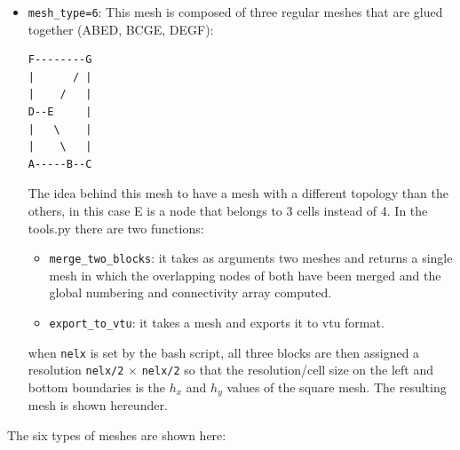 \begin{itemize}
\item \lstinline{mesh_type=6}: This mesh is composed of three
regular meshes that are glued together (ABED, BCGE, DEGF):
\begin{verbatim}
F--------G
|      / |
|    /   |
D--E     |
|   \    |
|    \   |
A-----B--C
\end{verbatim}
The idea behind this mesh to have a mesh with a different topology than the others, 
in this case E is a node that belongs to 3 cells instead of 4.
In the {\pythonfile tools.py} there are two functions:
\begin{itemize}
\item \verb'merge_two_blocks': it takes as arguments two meshes and returns a single mesh in which 
the overlapping nodes of both have been merged and the global numbering and connectivity array computed.
\item \verb'export_to_vtu': it takes a mesh and exports it to vtu format.
\end{itemize}
when \lstinline{nelx} is set by the bash script, all three blocks are then assigned a 
resolution \lstinline{nelx/2} $\times$ \lstinline{nelx/2} so that the resolution/cell size
on the left and bottom boundaries is the $h_x$ and $h_y$ values of the square mesh. 
The resulting mesh is shown hereunder. 
\end{itemize}

The six types of meshes are shown here:


